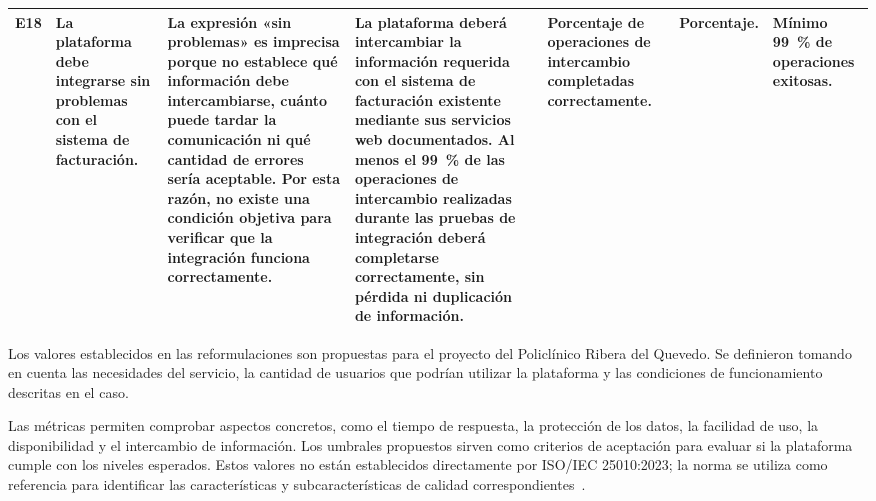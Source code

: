 \begin{landscape}
\begin{longtable}{|L{0.05\tw}|L{0.135\tw}|L{0.195\tw}|L{0.26\tw}|L{0.13\tw}|L{0.09\tw}|L{0.14\tw}|}
E18 & La plataforma debe integrarse sin problemas con el sistema de facturación. & La expresión «sin problemas» es imprecisa porque no establece qué información debe intercambiarse, cuánto puede tardar la comunicación ni qué cantidad de errores sería aceptable. Por esta razón, no existe una condición objetiva para verificar que la integración funciona correctamente. & La plataforma deberá intercambiar la información requerida con el sistema de facturación existente mediante sus servicios web documentados. Al menos el 99~\% de las operaciones de intercambio realizadas durante las pruebas de integración deberá completarse correctamente, sin pérdida ni duplicación de información. & Porcentaje de operaciones de intercambio completadas correctamente. & Porcentaje. & Mínimo 99~\% de operaciones exitosas. \\ \hline
\end{longtable}
\endgroup
\end{landscape}

Los valores establecidos en las reformulaciones son propuestas para el proyecto del Policlínico Ribera del Quevedo. Se definieron tomando en cuenta las necesidades del servicio, la cantidad de usuarios que podrían utilizar la plataforma y las condiciones de funcionamiento descritas en el caso.

Las métricas permiten comprobar aspectos concretos, como el tiempo de respuesta, la protección de los datos, la facilidad de uso, la disponibilidad y el intercambio de información. Los umbrales propuestos sirven como criterios de aceptación para evaluar si la plataforma cumple con los niveles esperados. Estos valores no están establecidos directamente por ISO/IEC 25010:2023; la norma se utiliza como referencia para identificar las características y subcaracterísticas de calidad correspondientes~\cite{iso25010}.
